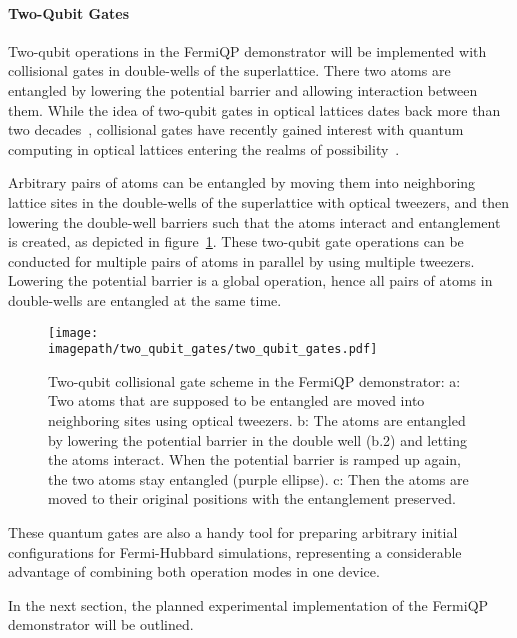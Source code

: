 \paragraph*{Two-Qubit Gates}
Two-qubit operations in the FermiQP demonstrator will be implemented with collisional gates in double-wells of the superlattice. There two atoms are entangled by lowering the potential barrier and allowing interaction between them. While the idea of two-qubit gates in optical lattices dates back more than two decades~\cite{jaksch_fast_2000, anderlini_controlled_2006,trotzky_time-resolved_2008}, collisional gates have recently gained interest with quantum computing in optical lattices entering the realms of possibility~\cite{dai_generation_2016, yang_cooling_2020, zhang_functional_2022}.

Arbitrary pairs of atoms can be entangled by moving them into neighboring lattice sites in the double-wells of the superlattice with optical tweezers, and then lowering the double-well barriers such that the atoms interact and entanglement is created, as depicted in figure~\ref{fig:two_qubit_gates}. These two-qubit gate operations can be conducted for multiple pairs of atoms in parallel by using multiple tweezers. Lowering the potential barrier is a global operation, hence all pairs of atoms in double-wells are entangled at the same time.

\begin{figure}
    \centering
    \texttt{[image: \\imagepath/two\_qubit\_gates/two\_qubit\_gates.pdf]}
    \caption{Two-qubit collisional gate scheme in the FermiQP demonstrator: a: Two atoms that are supposed to be entangled are moved into neighboring sites using optical tweezers. b: The atoms are entangled by lowering the potential barrier in the double well (b.2) and letting the atoms interact. When the potential barrier is ramped up again, the two atoms stay entangled (purple ellipse). c: Then the atoms are moved to their original positions with the entanglement preserved.}
    \label{fig:two_qubit_gates}
\end{figure}

These quantum gates are also a handy tool for preparing arbitrary initial configurations for Fermi-Hubbard simulations, representing a considerable advantage of combining both operation modes in one device.

\null

In the next section, the planned experimental implementation of the FermiQP demonstrator will be outlined.



